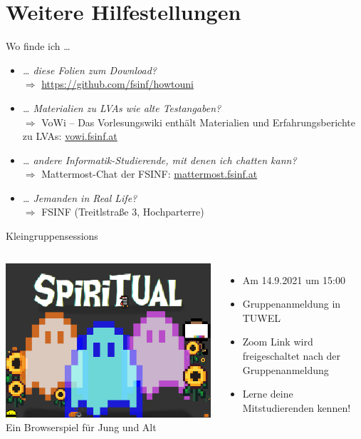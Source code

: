 \documentclass{beamer}
\begin{document}
\section{Weitere Hilfestellungen}

\begin{frame}{Wo finde ich \ldots}
    \begin{itemize}
        \item \textit{\ldots{} diese Folien zum Download?} \\
              $\Rightarrow$ \url{https://github.com/fsinf/howtouni}
        \item \textit{\ldots{} Materialien zu LVAs wie alte Testangaben?} \\
              $\Rightarrow$ VoWi -- Das Vorlesungswiki enthält Materialien und
              Erfahrungsberichte zu LVAs: \url{vowi.fsinf.at}
        \item \textit{\ldots{} andere Informatik-Studierende, mit denen ich
              chatten kann?} \\
              $\Rightarrow$ Mattermost-Chat der FSINF: \url{mattermost.fsinf.at}
        \item \textit{\ldots{} Jemanden in Real Life?} \\
              $\Rightarrow$ FSINF (Treitlstraße 3, Hochparterre)
    \end{itemize}
\end{frame}


\begin{frame}{Kleingruppensessions}
  \begin{columns}
      \centering
      \includegraphics[width=\textwidth]{spiritual_title.jpg}
      Ein Browserspiel für Jung und Alt
      \begin{itemize}
        \item Am 14.9.2021 um 15:00
        \item Gruppenanmeldung in TUWEL
        \item Zoom Link wird freigeschaltet nach der Gruppenanmeldung
        \item Lerne deine Mitstudierenden kennen!
      \end{itemize}
  \end{columns}
\end{frame}
\end{document}
